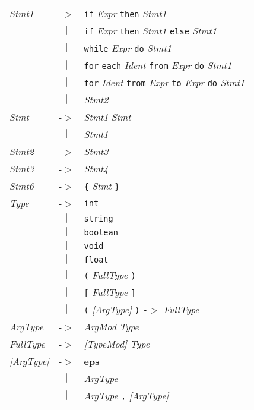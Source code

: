\documentclass{article}
\begin{document}
\begin{center}
\begin{tabular}{lll}
\textit{Stmt1} & -$>$ & \texttt{if} \textit{Expr} \texttt{then} \textit{Stmt1} \\
 & \multicolumn{1}{c}{\textbf{$|$}} & \texttt{if} \textit{Expr} \texttt{then} \textit{Stmt1} \texttt{else} \textit{Stmt1} \\
 & \multicolumn{1}{c}{\textbf{$|$}} & \texttt{while} \textit{Expr} \texttt{do} \textit{Stmt1} \\
 & \multicolumn{1}{c}{\textbf{$|$}} & \texttt{for} \texttt{each} \textit{Ident} \texttt{from} \textit{Expr} \texttt{do} \textit{Stmt1} \\
 & \multicolumn{1}{c}{\textbf{$|$}} & \texttt{for} \textit{Ident} \texttt{from} \textit{Expr} \texttt{to} \textit{Expr} \texttt{do} \textit{Stmt1} \\
 & \multicolumn{1}{c}{\textbf{$|$}} & \textit{Stmt2} \\
\textit{Stmt} & -$>$ & \textit{Stmt1} \textit{Stmt} \\
 & \multicolumn{1}{c}{\textbf{$|$}} & \textit{Stmt1} \\
\textit{Stmt2} & -$>$ & \textit{Stmt3} \\
\textit{Stmt3} & -$>$ & \textit{Stmt4} \\
\textit{Stmt6} & -$>$ & \texttt{\{} \textit{Stmt} \texttt{\}} \\
\textit{Type} & -$>$ & \texttt{int} \\
 & \multicolumn{1}{c}{\textbf{$|$}} & \texttt{string} \\
 & \multicolumn{1}{c}{\textbf{$|$}} & \texttt{boolean} \\
 & \multicolumn{1}{c}{\textbf{$|$}} & \texttt{void} \\
 & \multicolumn{1}{c}{\textbf{$|$}} & \texttt{float} \\
 & \multicolumn{1}{c}{\textbf{$|$}} & \texttt{(} \textit{FullType} \texttt{)} \\
 & \multicolumn{1}{c}{\textbf{$|$}} & \texttt{[} \textit{FullType} \texttt{]} \\
 & \multicolumn{1}{c}{\textbf{$|$}} & \texttt{(} \textit{[ArgType]} \texttt{)} \texttt{-$>$} \textit{FullType} \\
\textit{ArgType} & -$>$ & \textit{ArgMod} \textit{Type} \\
\textit{FullType} & -$>$ & \textit{[TypeMod]} \textit{Type} \\
\textit{[ArgType]} & -$>$ & \textbf{eps} \\
 & \multicolumn{1}{c}{\textbf{$|$}} & \textit{ArgType} \\
 & \multicolumn{1}{c}{\textbf{$|$}} & \textit{ArgType} \texttt{,} \textit{[ArgType]} \\

\end{tabular}
\end{center}
\end{document}
